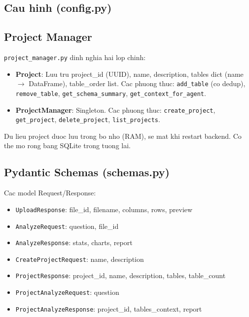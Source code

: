 \documentclass[12pt,a4paper]{article}
\begin{document}
\subsection{Cau hinh (config.py)}



\subsection{Project Manager}

\texttt{project\_manager.py} dinh nghia hai lop chinh:

\begin{itemize}
  \item \textbf{Project}: Luu tru project\_id (UUID), name, description,
        tables dict (name $\rightarrow$ DataFrame), table\_order list.
        Cac phuong thuc: \texttt{add\_table} (co dedup), \texttt{remove\_table},
        \texttt{get\_schema\_summary}, \texttt{get\_context\_for\_agent}.
  \item \textbf{ProjectManager}: Singleton. Cac phuong thuc:
        \texttt{create\_project}, \texttt{get\_project},
        \texttt{delete\_project}, \texttt{list\_projects}.
\end{itemize}

Du lieu project duoc luu trong bo nho (RAM), se mat khi restart backend.
Co the mo rong bang SQLite trong tuong lai.

\subsection{Pydantic Schemas (schemas.py)}

Cac model Request/Response:

\begin{itemize}
  \item \texttt{UploadResponse}: file\_id, filename, columns, rows, preview
  \item \texttt{AnalyzeRequest}: question, file\_id
  \item \texttt{AnalyzeResponse}: stats, charts, report
  \item \texttt{CreateProjectRequest}: name, description
  \item \texttt{ProjectResponse}: project\_id, name, description, tables,
        table\_count
  \item \texttt{ProjectAnalyzeRequest}: question
  \item \texttt{ProjectAnalyzeResponse}: project\_id, tables\_context, report
\end{itemize}
\end{document}
